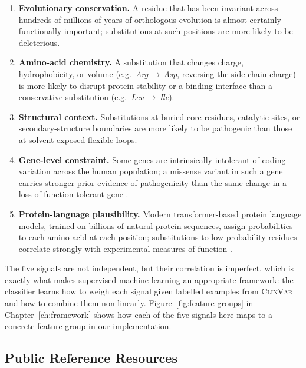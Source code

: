 \documentclass[11pt,a4paper,oneside]{report}
\begin{document}
\begin{enumerate}
  \item \textbf{Evolutionary conservation.} A residue that has
    been invariant across hundreds of millions of years of
    orthologous evolution is almost certainly functionally
    important; substitutions at such positions are more likely
    to be deleterious.
  \item \textbf{Amino-acid chemistry.} A substitution that
    changes charge, hydrophobicity, or volume (e.g.\
    \emph{Arg}\,$\rightarrow$\,\emph{Asp}, reversing the
    side-chain charge) is more likely to disrupt protein
    stability or a binding interface than a conservative
    substitution (e.g.\ \emph{Leu}\,$\rightarrow$\,\emph{Ile}).
  \item \textbf{Structural context.} Substitutions at buried
    core residues, catalytic sites, or secondary-structure
    boundaries are more likely to be pathogenic than those at
    solvent-exposed flexible loops.
  \item \textbf{Gene-level constraint.} Some genes are
    intrinsically intolerant of coding variation across the
    human population; a missense variant in such a gene carries
    stronger prior evidence of pathogenicity than the same
    change in a loss-of-function-tolerant gene
    \citep{karczewski2020gnomad}.
  \item \textbf{Protein-language plausibility.} Modern
    transformer-based protein language models, trained on
    billions of natural protein sequences, assign probabilities
    to each amino acid at each position; substitutions to
    low-probability residues correlate strongly with
    experimental measures of function
    \citep{meier2021language, brandes2023esm1b}.
\end{enumerate}

The five signals are not independent, but their correlation is
imperfect, which is exactly what makes supervised machine
learning an appropriate framework: the classifier learns how to
weigh each signal given labelled examples from \textsc{ClinVar}
and how to combine them non-linearly. Figure~\ref{fig:feature-groups}
in Chapter~\ref{ch:framework} shows how each of the five signals
here maps to a concrete feature group in our implementation.

\subsection{Public Reference Resources}
\label{sec:intro-resources}
\end{document}
